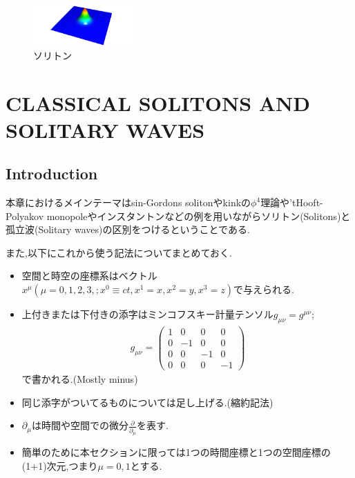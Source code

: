\documentclass[dvipdfmx,11pt,a4paper,oneside,openany]{jsbook}
\begin{document}
\begin{figure}[H]
    \centering
    \includegraphics[width=4cm]{figure/soliton.png}
    \caption{ソリトン}
    \label{soliton}
\end{figure}

\chapter{CLASSICAL SOLITONS AND SOLITARY WAVES}
\section{Introduction}
本章におけるメインテーマはsin-Gordons solitonやkinkの$\phi^4$理論や'tHooft-Polyakov monopoleやインスタントンなどの例を用いながらソリトン(Solitons)と孤立波(Solitary waves)の区別をつけるということである.

また,以下にこれから使う記法についてまとめておく.
\begin{screen}
    \begin{itemize}
        \item 空間と時空の座標系はベクトル$x^{\mu}(\mu=0, 1, 2, 3, ; x^{0}\equiv ct, x^{1}=x, x^{2}=y, x^{3}=z)$で与えられる.
        \item 上付きまたは下付きの添字はミンコフスキー計量テンソル$g_{\mu \nu}=g^{\mu \nu}$;
              \begin{align*}
                  g_{\mu \nu}=
                  \left(\begin{array}{cccc}
                          1 & 0  & 0  & 0  \\
                          0 & -1 & 0  & 0  \\
                          0 & 0  & -1 & 0  \\
                          0 & 0  & 0  & -1
                      \end{array}\right)
              \end{align*}
              で書かれる.(Mostly minus)
        \item 同じ添字がついてるものについては足し上げる.(縮約記法)
        \item $\partial_{\mu}$は時間や空間での微分$\frac{\partial}{\partial_{\mu}}$を表す.
        \item 簡単のために本セクションに限っては1つの時間座標と1つの空間座標の(1+1)次元,つまり$\mu=0,1$とする.
    \end{itemize}
\end{screen}
\end{document}
